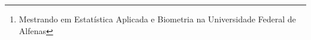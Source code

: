\usepackage[labelsep=endash]{caption}

\newcommand{\HRule}{\noindent\rule{\linewidth}{0.2mm}}

\usepackage{mathpazo}                         %
\usepackage[scaled=0.85]{beramono}            %

\renewcommand\UrlFont{\color{black}\rmfamily} 

\def\distnumber{2.3em}


\author{Walef Machado de Mendonça\footnote{Mestrando em Estatística Aplicada e Biometria na Universidade Federal de Alfenas}}

